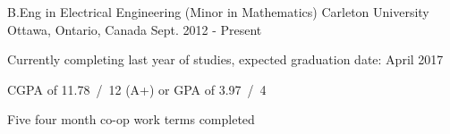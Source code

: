 

\begin{cventries}

  \cventry
    {B.Eng in Electrical Engineering (Minor in Mathematics)} %
    {Carleton University} %
    {Ottawa, Ontario, Canada} %
    {Sept. 2012 - Present} %
    {
      \begin{cvitems} %
        \item {Currently completing last year of studies, expected graduation date: April 2017}
        \item {CGPA of 11.78~/~12 (A+) or GPA of 3.97~/~4}
        \item {Five four month co-op work terms completed}
      \end{cvitems}
    }

\end{cventries}
